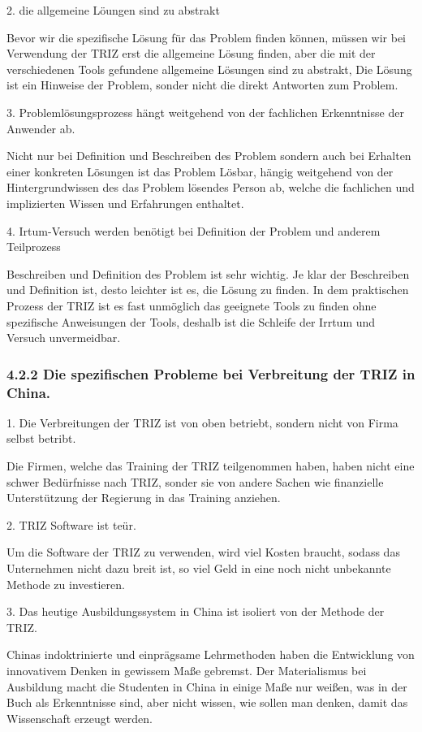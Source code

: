 \documentclass[11pt,a4paper]{article}
\begin{document}
2. die allgemeine Löungen sind  zu abstrakt

Bevor wir die spezifische Lösung für das Problem finden können, müssen wir
bei Verwendung der TRIZ erst die allgemeine Lösung finden, aber die mit der
verschiedenen Tools gefundene allgemeine Lösungen sind zu abstrakt, Die Lösung
ist ein Hinweise der Problem, sonder nicht die direkt Antworten zum Problem.

3. Problemlösungsprozess hängt weitgehend von der fachlichen Erkenntnisse der
Anwender ab.

Nicht nur bei Definition und Beschreiben des Problem sondern auch bei Erhalten
einer konkreten Lösungen ist das Problem Lösbar, hängig weitgehend von der
Hintergrundwissen des das Problem lösendes Person  ab, welche die fachlichen
und implizierten Wissen und Erfahrungen enthaltet.

4. Irtum-Versuch werden benötigt bei Definition der Problem und anderem
Teilprozess

Beschreiben und Definition des Problem ist sehr wichtig. Je klar der
Beschreiben und Definition ist, desto leichter ist es, die Lösung zu
finden. In dem praktischen Prozess der TRIZ ist es fast unmöglich das
geeignete Tools zu finden ohne spezifische Anweisungen der Tools, deshalb ist
die Schleife der Irrtum und Versuch unvermeidbar.


\subsubsection{4.2.2  Die spezifischen Probleme bei Verbreitung der TRIZ in
  China.}

1. Die Verbreitungen der TRIZ ist von oben betriebt, sondern nicht von Firma
selbst betribt.

Die Firmen, welche das Training der TRIZ teilgenommen haben, haben nicht eine
schwer Bedürfnisse nach TRIZ, sonder sie von andere Sachen wie finanzielle
Unterstützung der Regierung in das Training anziehen.

2. TRIZ Software ist teür.

Um die Software der TRIZ zu verwenden, wird viel Kosten braucht, sodass das
Unternehmen nicht dazu breit ist, so viel Geld in eine noch nicht unbekannte
Methode zu investieren.

3. Das heutige  Ausbildungssystem in China ist isoliert von der Methode der
TRIZ.

Chinas indoktrinierte und einprägsame Lehrmethoden haben die Entwicklung von
innovativem Denken in gewissem Maße gebremst. Der Materialismus bei Ausbildung
macht die Studenten in China in einige Maße nur weißen, was in der Buch als
Erkenntnisse sind, aber nicht wissen, wie sollen man denken, damit das
Wissenschaft erzeugt werden.
\end{document}
